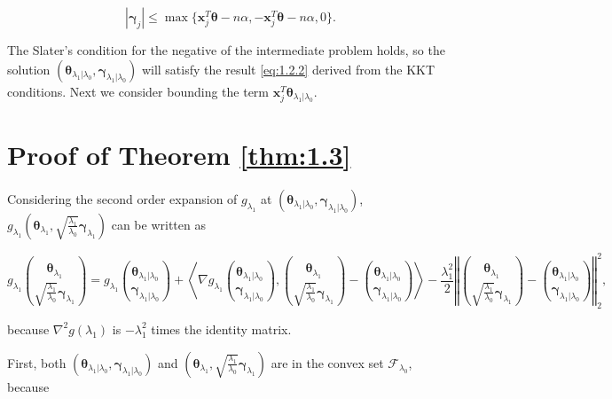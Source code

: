 \begin{equation}
    \label{eq:1.2.2}
    |\boldsymbol\gamma_j|\leq \max\{\boldsymbol x_j^T\boldsymbol\theta-n\alpha,-\boldsymbol x_j^T\boldsymbol\theta-n\alpha,0\}.
\end{equation}

The Slater's condition for the negative of the intermediate problem holds, so the solution $(\boldsymbol\theta_{\lambda_1|\lambda_0},\boldsymbol\gamma_{\lambda_1|\lambda_0})$ will satisfy the result \eqref{eq:1.2.2} derived from the KKT conditions. Next we consider bounding the term $\boldsymbol x_j^T\boldsymbol\theta_{\lambda_1|\lambda_0}$.

\section{Proof of Theorem \ref{thm:1.3}}

Considering the second order expansion of $g_{\lambda_1}$ at $(\boldsymbol\theta_{\lambda_1|\lambda_0},\boldsymbol\gamma_{\lambda_1|\lambda_0})$, $g_{\lambda_1}\left(\boldsymbol\theta_{\lambda_1},\sqrt{\frac{\lambda_1}{\lambda_0}}\boldsymbol\gamma_{\lambda_1}\right)$ can be written as

\begin{equation}
    \label{eq:1.3.1}
    g_{\lambda_1}\binom{\boldsymbol\theta_{\lambda_1}}{\sqrt{\frac{\lambda_1}{\lambda_0}}\boldsymbol\gamma_{\lambda_1}}=g_{\lambda_1}\binom{\boldsymbol\theta_{\lambda_1|\lambda_0}}{\boldsymbol\gamma_{\lambda_1|\lambda_0}}+\left\langle\nabla g_{\lambda_1}\binom{\boldsymbol\theta_{\lambda_1|\lambda_0}}{\boldsymbol\gamma_{\lambda_1|\lambda_0}},\binom{\boldsymbol\theta_{\lambda_1}}{\sqrt{\frac{\lambda_1}{\lambda_0}}\boldsymbol\gamma_{\lambda_1}}-\binom{\boldsymbol\theta_{\lambda_1|\lambda_0}}{\boldsymbol\gamma_{\lambda_1|\lambda_0}}\right\rangle-\frac{\lambda_1^2}{2}\left\Vert\binom{\boldsymbol\theta_{\lambda_1}}{\sqrt{\frac{\lambda_1}{\lambda_0}}\boldsymbol\gamma_{\lambda_1}}-\binom{\boldsymbol\theta_{\lambda_1|\lambda_0}}{\boldsymbol\gamma_{\lambda_1|\lambda_0}}\right\Vert_2^2,
\end{equation}

because $\nabla^2g(\lambda_1)$ is $-\lambda_1^2$ times the identity matrix. 

First, both $(\boldsymbol\theta_{\lambda_1|\lambda_0},\boldsymbol\gamma_{\lambda_1|\lambda_0})$ and $\left(\boldsymbol\theta_{\lambda_1},\sqrt{\frac{\lambda_1}{\lambda_0}}\boldsymbol\gamma_{\lambda_1}\right)$ are in the convex set $\mathcal{F}_{\lambda_0}$, because

